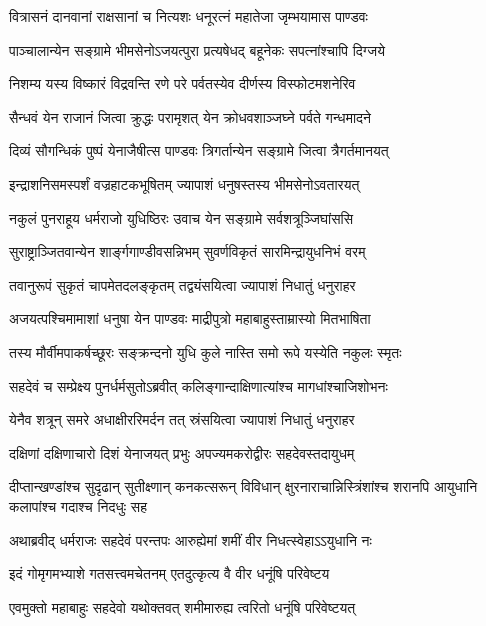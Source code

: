 \twolineshloka
{वित्रासनं दानवानां राक्षसानां च नित्यशः}
{धनूरत्नं महातेजा जृम्भयामास पाण्डवः}


\twolineshloka
{पाञ्चालान्येन सङ्ग्रामे भीमसेनोऽजयत्पुरा}
{प्रत्यषेधद् बहूनेकः सपत्नांश्चापि दिग्जये}


\twolineshloka
{निशम्य यस्य विष्कारं विद्रवन्ति रणे परे}
{पर्वतस्येव दीर्णस्य विस्फोटमशनेरिव}


\twolineshloka
{सैन्धवं येन राजानं जित्वा क्रुद्धः परामृशत्}
{येन क्रोधवशाञ्जघ्ने पर्वते गन्धमादने}


\twolineshloka
{दिव्यं सौगन्धिकं पुष्पं येनाजैषीत्स पाण्डवः}
{त्रिगर्तान्येन सङ्ग्रामे जित्वा त्रैगर्तमानयत्}


\twolineshloka
{इन्द्राशनिसमस्पर्शं वज्रहाटकभूषितम्}
{ज्यापाशं धनुषस्तस्य भीमसेनोऽवतारयत्}


\twolineshloka
{नकुलं पुनराहूय धर्मराजो युधिष्ठिरः}
{उवाच येन सङ्ग्रामे सर्वशत्रूञ्जिघांससि}


\twolineshloka
{सुराष्ट्राञ्जितवान्येन शार्ङ्गगाण्डीवसन्निभम्}
{सुवर्णविकृतं सारमिन्द्रायुधनिभं वरम्}


\twolineshloka
{तवानुरूपं सुकृतं चापमेतदलङ्कृतम्}
{तद्व्यंसयित्वा ज्यापाशं निधातुं धनुराहर}



\twolineshloka
{अजयत्पश्चिमामाशां धनुषा येन पाण्डवः}
{माद्रीपुत्रो महाबाहुस्ताम्रास्यो मितभाषिता}


\twolineshloka
{तस्य मौर्वीमपाकर्षच्छूरः सङ्क्रन्दनो युधि}
{कुले नास्ति समो रूपे यस्येति नकुलः स्मृतः}


\twolineshloka
{सहदेवं च सम्प्रेक्ष्य पुनर्धर्मसुतोऽब्रवीत्}
{कलिङ्गान्दाक्षिणात्यांश्च मागधांश्चाजिशोभनः}


\twolineshloka
{येनैव शत्रून् समरे अधाक्षीररिमर्दन}
{तत् स्रंसयित्वा ज्यापाशं निधातुं धनुराहर}



\twolineshloka
{दक्षिणां दक्षिणाचारो दिशं येनाजयत् प्रभुः}
{अपज्यमकरोद्वीरः सहदेवस्तदायुधम्}


\threelineshloka
{दीप्तान्खण्डांश्च सुदृढान् सुतीक्ष्णान् कनकत्सरून्}
{विविधान् क्षुरनाराचान्निस्त्रिंशांश्च शरानपि}
{आयुधानि कलापांश्च गदाश्च निदधुः सह}


\twolineshloka
{अथाब्रवीद् धर्मराजः सहदेवं परन्तपः}
{आरुह्येमां शमीं वीर निधत्स्वेहाऽऽयुधानि नः}


\twolineshloka
{इदं गोमृगमभ्याशे गतसत्त्वमचेतनम्}
{एतदुत्कृत्य वै वीर धनूंषि परिवेष्टय}


\twolineshloka
{एवमुक्तो महाबाहुः सहदेवो यथोक्तवत्}
{शमीमारुह्य त्वरितो धनूंषि परिवेष्टयत्}


